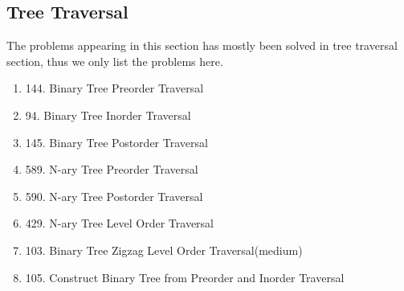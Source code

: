 \documentclass[../main.tex]{subfiles}
\begin{document}
\subsection{Tree Traversal}
The problems appearing in this section has mostly been solved in tree traversal section, thus we only list the problems here. 
\begin{enumerate}
    \item 144. Binary Tree Preorder Traversal
    \item 94. Binary Tree Inorder Traversal
    \item 145. Binary Tree Postorder Traversal
    \item 589. N-ary Tree Preorder Traversal
    \item 590. N-ary Tree Postorder Traversal
    \item 429. N-ary Tree Level Order Traversal
    \item 103. Binary Tree Zigzag Level Order Traversal(medium)
    \item 105. Construct Binary Tree from Preorder and Inorder Traversal
\end{enumerate}
\end{document}
